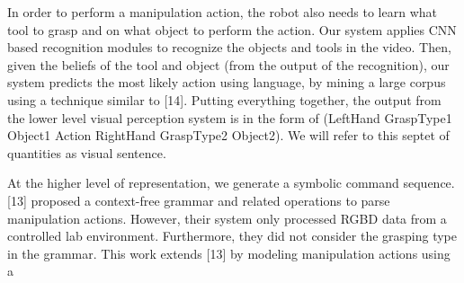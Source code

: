 {In order to perform a manipulation action, the robot also needs to learn what tool to grasp and on what object to perform the action. Our system applies CNN based recognition modules to recognize the objects and tools in the video. Then, given the beliefs of the tool and object (from the output of the recognition), our system predicts the most likely action using language, by mining a large corpus using a technique similar to [14]. Putting everything together, the output from the lower level visual perception system is in the form of (LeftHand GraspType1 Object1 Action RightHand GraspType2 Object2). We will refer to this septet of quantities as visual sentence.

At the higher level of representation, we generate a symbolic command sequence. [13] proposed a context-free grammar and related operations to parse manipulation actions. However, their system only processed RGBD data from a controlled lab environment. Furthermore, they did not consider the grasping type in the grammar. This work extends [13] by modeling manipulation actions using a


}







